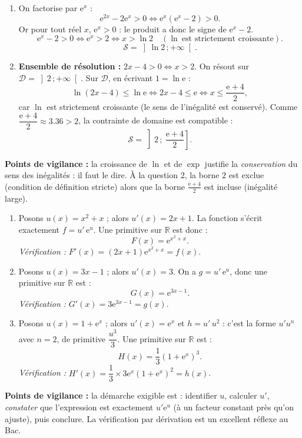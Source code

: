 \documentclass[11pt]{article}
\begin{document}
\begin{corrige}
\begin{enumerate}
\item On factorise par $\mathrm{e}^{x}$ :
\[ \mathrm{e}^{2x} - 2\mathrm{e}^{x} > 0 \iff \mathrm{e}^{x}\left(\mathrm{e}^{x} - 2\right) > 0. \]
Or pour tout réel $x$, $\mathrm{e}^{x} > 0$ : le produit a donc le signe de $\mathrm{e}^{x} - 2$.
\[ \mathrm{e}^{x} - 2 > 0 \iff \mathrm{e}^{x} > 2 \iff x > \ln 2 \quad (\ln\ \text{est strictement croissante}). \]
\[ \mathcal{S} = \left]\ln 2\,;+\infty\right[. \]
\item \textbf{Ensemble de résolution :} $2x - 4 > 0 \iff x > 2$. On résout sur $\mathcal{D} = \left]2\,;+\infty\right[$. Sur $\mathcal{D}$, en écrivant $1 = \ln \mathrm{e}$ :
\[ \ln(2x-4) \leq \ln \mathrm{e} \iff 2x - 4 \leq \mathrm{e} \iff x \leq \dfrac{\mathrm{e}+4}{2}, \]
car $\ln$ est strictement croissante (le sens de l'inégalité est conservé). Comme $\dfrac{\mathrm{e}+4}{2} \approx \num{3,36} > 2$, la contrainte de domaine est compatible :
\[ \mathcal{S} = \left]2\,;\ \dfrac{\mathrm{e}+4}{2}\right]. \]
\end{enumerate}
\textbf{Points de vigilance :} la croissance de $\ln$ et de $\exp$ justifie la \emph{conservation} du sens des inégalités : il faut le dire. À la question 2, la borne $2$ est exclue (condition de définition stricte) alors que la borne $\frac{\mathrm{e}+4}{2}$ est incluse (inégalité large).
\end{corrige}

\begin{corrige}
\begin{enumerate}
\item Posons $u(x) = x^{2} + x$ ; alors $u'(x) = 2x + 1$. La fonction s'écrit exactement $f = u'\,\mathrm{e}^{u}$. Une primitive sur $\mathbb{R}$ est donc :
\[ F(x) = \mathrm{e}^{x^{2}+x}. \]
\emph{Vérification :} $F'(x) = (2x+1)\mathrm{e}^{x^{2}+x} = f(x)$. 
\item Posons $u(x) = 3x - 1$ ; alors $u'(x) = 3$. On a $g = u'\,\mathrm{e}^{u}$, donc une primitive sur $\mathbb{R}$ est :
\[ G(x) = \mathrm{e}^{3x-1}. \]
\emph{Vérification :} $G'(x) = 3\mathrm{e}^{3x-1} = g(x)$. 
\item Posons $u(x) = 1 + \mathrm{e}^{x}$ ; alors $u'(x) = \mathrm{e}^{x}$ et $h = u'\,u^{2}$ : c'est la forme $u'u^{n}$ avec $n = 2$, de primitive $\dfrac{u^{3}}{3}$. Une primitive sur $\mathbb{R}$ est :
\[ H(x) = \dfrac{1}{3}\left(1 + \mathrm{e}^{x}\right)^{3}. \]
\emph{Vérification :} $H'(x) = \dfrac{1}{3}\times 3\mathrm{e}^{x}\left(1+\mathrm{e}^{x}\right)^{2} = h(x)$. 
\end{enumerate}
\textbf{Points de vigilance :} la démarche exigible est : identifier $u$, calculer $u'$, \emph{constater} que l'expression est exactement $u'\mathrm{e}^{u}$ (à un facteur constant près qu'on ajuste), puis conclure. La vérification par dérivation est un excellent réflexe au Bac.
\end{corrige}
\end{document}
